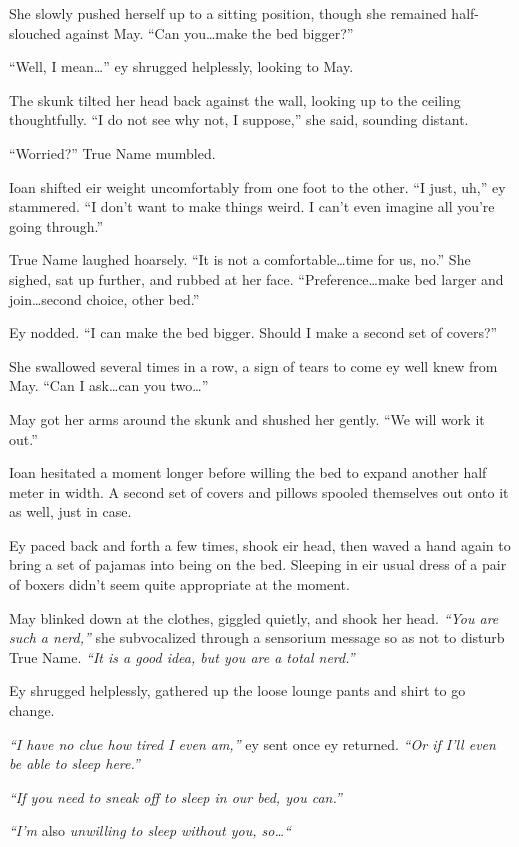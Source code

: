 She slowly pushed herself up to a sitting position, though she remained half-slouched against May. ``Can you\ldots make the bed bigger?''

``Well, I mean\ldots{}'' ey shrugged helplessly, looking to May.

The skunk tilted her head back against the wall, looking up to the ceiling thoughtfully. ``I do not see why not, I suppose,'' she said, sounding distant.

``Worried?'' True Name mumbled.

Ioan shifted eir weight uncomfortably from one foot to the other. ``I just, uh,'' ey stammered. ``I don't want to make things weird. I can't even imagine all you're going through.''

True Name laughed hoarsely. ``It is not a comfortable\ldots time for us, no.'' She sighed, sat up further, and rubbed at her face. ``Preference\ldots make bed larger and join\ldots second choice, other bed.''

Ey nodded. ``I can make the bed bigger. Should I make a second set of covers?''

She swallowed several times in a row, a sign of tears to come ey well knew from May. ``Can I ask\ldots can you two\ldots{}''

May got her arms around the skunk and shushed her gently. ``We will work it out.''

Ioan hesitated a moment longer before willing the bed to expand another half meter in width. A second set of covers and pillows spooled themselves out onto it as well, just in case.

Ey paced back and forth a few times, shook eir head, then waved a hand again to bring a set of pajamas into being on the bed. Sleeping in eir usual dress of a pair of boxers didn't seem quite appropriate at the moment.

May blinked down at the clothes, giggled quietly, and shook her head. \emph{``You are such a nerd,''} she subvocalized through a sensorium message so as not to disturb True Name. \emph{``It is a good idea, but you are a total nerd.''}

Ey shrugged helplessly, gathered up the loose lounge pants and shirt to go change.

\emph{``I have no clue how tired I even am,''} ey sent once ey returned. \emph{``Or if I'll even be able to sleep here.''}

\emph{``If you need to sneak off to sleep in our bed, you can.''}

\emph{``I'm} also \emph{unwilling to sleep without you, so\ldots``}

